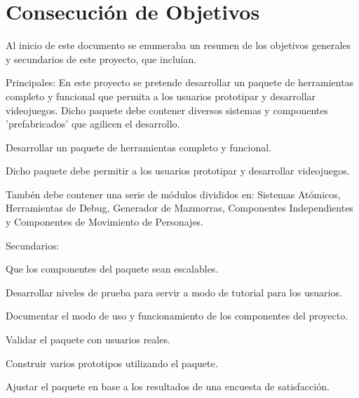 \section{Consecución de Objetivos}

Al inicio de este documento se enumeraba un resumen de los objetivos generales y secundarios de este proyecto, que incluían.

Principales:
En este proyecto se pretende desarrollar un paquete de herramientas completo y funcional que permita a los usuarios prototipar y desarrollar videojuegos. Dicho paquete debe contener diversos sistemas y
 componentes 'prefabricados' que agilicen el desarrollo. 

\begin{compactitem}
    \item Desarrollar un paquete de herramientas completo y funcional.
    \item Dicho paquete debe permitir a los usuarios prototipar y desarrollar videojuegos.
    \item Tambén debe contener una serie de módulos divididos en: Sistemas Atómicos, Herramientas de Debug, Generador de Mazmorras, Componentes Independientes y Componentes de Movimiento de Personajes.
\end{compactitem}

Secundarios:
\begin{compactitem}
  \item Que los componentes del paquete sean escalables.
  \item Desarrollar niveles de prueba para servir a modo de tutorial para los usuarios.
  \item Documentar el modo de uso y funcionamiento de los componentes del proyecto.
  \item Validar el paquete con usuarios reales.
  \item Construir varios prototipos utilizando el paquete.
  \item Ajustar el paquete en base a los resultados de una encuesta de satisfacción.
\end{compactitem}


